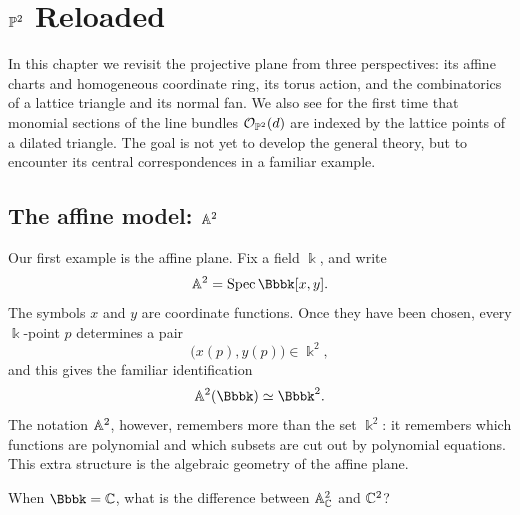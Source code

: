 \chapter{\texorpdfstring{\(\mathbb{P}^2\) Reloaded}{P2 Reloaded}}
\label{chap:p2-reloaded}

\begin{chapteroverview}
In this chapter we revisit the projective plane from three perspectives:
its affine charts and homogeneous coordinate ring, its torus action,
and the combinatorics of a lattice triangle and its normal fan. We also see for
the first time that monomial sections of the line bundles
\(\mathcal{O}_{\mathbb{P}^2}(d)\) are indexed by the lattice points of a dilated
triangle. The goal is not yet to develop the general theory, but to
encounter its central correspondences in a familiar example.
\end{chapteroverview}


\section{The affine model: \texorpdfstring{\(\mathbb{A}^2\)}{A2}}
\label{sec:p2-affine-model}

Our first example is the affine plane. Fix a field \(\Bbbk\), and write
\[
\AAA^2=\Spec \Bbbk[x,y].
\]
The symbols \(x\) and \(y\) are coordinate functions. Once they have
been chosen, every \(\Bbbk\)-point \(p\) determines a pair
\[
\bigl(x(p),y(p)\bigr)\in\Bbbk^2,
\]
and this gives the familiar identification
\[
\AAA^2(\Bbbk)\simeq\Bbbk^2.
\]
The notation \(\mathbb{A}^2\), however, remembers more than the set
\(\Bbbk^2\): it remembers which functions are polynomial and which
subsets are cut out by polynomial equations. This extra structure is
the algebraic geometry of the affine plane.

\begin{guidingquestion}
When \(\Bbbk=\CC\), what is the difference between
\(\mathbb{A}^2_{\mathbb{C}}\) and \(\mathbb{C}^2\)?
\end{guidingquestion}

